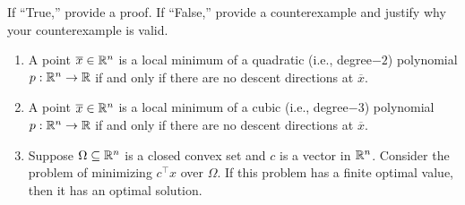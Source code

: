 If ``True,” provide a proof. If ``False,” provide a counterexample and justify why your counterexample is valid.
\begin{enumerate}[leftmargin=*]
\item A point $\overline x \in \mathbb{R}^n$ is a local minimum of a quadratic (i.e., degree$-2$) polynomial $p : \mathbb{R}^n \to \mathbb{R}$ if and only if there are no descent directions at $\overline x$.
\item A point $\overline x \in \mathbb{R}^n$ is a local minimum of a cubic (i.e., degree$-3$) polynomial $p : \mathbb{R}^n \to \mathbb{R}$ if and only if there are no descent directions at $\overline x$.
\item Suppose $\Omega \subseteq \mathbb{R}^n$ is a closed convex set and $c$ is a vector in $\mathbb{R}^n$. Consider the problem of minimizing $c^\top x$ over $\Omega$. If this problem has a finite optimal value, then it has an optimal solution.
\end{enumerate}

\soln


